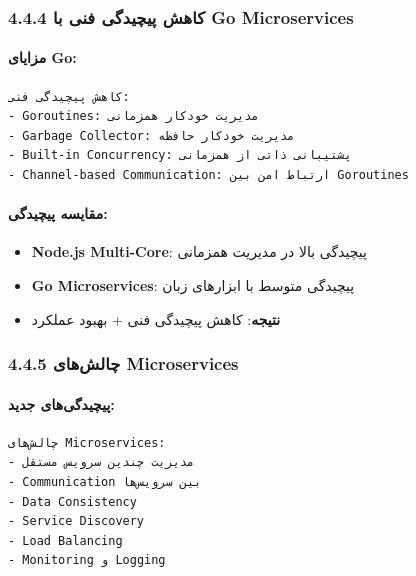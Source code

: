 \documentclass[
]{article}
\providecommand{\tightlist}{%
  \setlength{\itemsep}{0pt}\setlength{\parskip}{0pt}}
\begin{document}
\subsubsection{4.4.4 کاهش پیچیدگی فنی با Go
Microservices}\label{ux6a9ux627ux647ux634-ux67eux6ccux686ux6ccux62fux6afux6cc-ux641ux646ux6cc-ux628ux627-go-microservices}

\paragraph{مزایای Go:}\label{ux645ux632ux627ux6ccux627ux6cc-go}

\begin{verbatim}
کاهش پیچیدگی فنی:
- Goroutines: مدیریت خودکار همزمانی
- Garbage Collector: مدیریت خودکار حافظه
- Built-in Concurrency: پشتیبانی ذاتی از همزمانی
- Channel-based Communication: ارتباط امن بین Goroutines
\end{verbatim}

\paragraph{مقایسه
پیچیدگی:}\label{ux645ux642ux627ux6ccux633ux647-ux67eux6ccux686ux6ccux62fux6afux6cc}

\begin{itemize}
\tightlist
\item
  \textbf{Node.js Multi-Core}: پیچیدگی بالا در مدیریت همزمانی
\item
  \textbf{Go Microservices}: پیچیدگی متوسط با ابزارهای زبان
\item
  \textbf{نتیجه}: کاهش پیچیدگی فنی + بهبود عملکرد
\end{itemize}

\subsubsection{4.4.5 چالش‌های
Microservices}\label{ux686ux627ux644ux634ux647ux627ux6cc-microservices}

\paragraph{پیچیدگی‌های
جدید:}\label{ux67eux6ccux686ux6ccux62fux6afux6ccux647ux627ux6cc-ux62cux62fux6ccux62f}

\begin{verbatim}
چالش‌های Microservices:
- مدیریت چندین سرویس مستقل
- Communication بین سرویس‌ها
- Data Consistency
- Service Discovery
- Load Balancing
- Monitoring و Logging
\end{verbatim}
\end{document}
